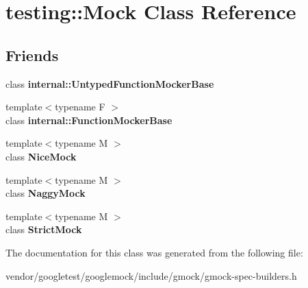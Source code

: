 \hypertarget{classtesting_1_1Mock}{}\section{testing\+:\+:Mock Class Reference}
\label{classtesting_1_1Mock}
\subsection*{Friends}
\begin{DoxyCompactItemize}
\item 
class {\bfseries internal\+::\+Untyped\+Function\+Mocker\+Base}\hypertarget{classtesting_1_1Mock_aa199ba5b2fe114afc42c43912a582feb}{}\label{classtesting_1_1Mock_aa199ba5b2fe114afc42c43912a582feb}

\item 
{\footnotesize template$<$typename F $>$ }\\class {\bfseries internal\+::\+Function\+Mocker\+Base}\hypertarget{classtesting_1_1Mock_a1945aea400fdb50639e5cdf43c583687}{}\label{classtesting_1_1Mock_a1945aea400fdb50639e5cdf43c583687}

\item 
{\footnotesize template$<$typename M $>$ }\\class {\bfseries Nice\+Mock}\hypertarget{classtesting_1_1Mock_a9e796f79d4c876398f83aa7678dddc46}{}\label{classtesting_1_1Mock_a9e796f79d4c876398f83aa7678dddc46}

\item 
{\footnotesize template$<$typename M $>$ }\\class {\bfseries Naggy\+Mock}\hypertarget{classtesting_1_1Mock_aee2e427ecb34e6662477add3bb5f8819}{}\label{classtesting_1_1Mock_aee2e427ecb34e6662477add3bb5f8819}

\item 
{\footnotesize template$<$typename M $>$ }\\class {\bfseries Strict\+Mock}\hypertarget{classtesting_1_1Mock_a88b3d71476c27b82c88bd49e8297e20e}{}\label{classtesting_1_1Mock_a88b3d71476c27b82c88bd49e8297e20e}

\end{DoxyCompactItemize}


The documentation for this class was generated from the following file\+:\begin{DoxyCompactItemize}
\item 
vendor/googletest/googlemock/include/gmock/gmock-\/spec-\/builders.\+h\end{DoxyCompactItemize}
